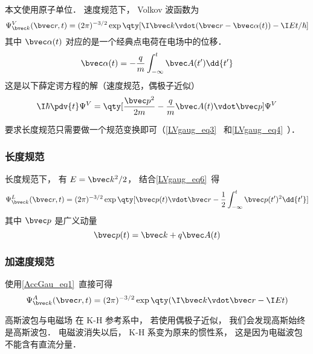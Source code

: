 

本文使用原子单位． 速度规范下， Volkov 波函数为
\begin{equation}
\Psi_{\bvec k}^V(\bvec r, t) = (2\pi)^{-3/2} \exp\qty[\I \bvec k \vdot (\bvec r - \bvec \alpha(t)) - \I Et/\hbar]
\end{equation}
其中 $\bvec \alpha(t)$ 对应的是一个经典点电荷在电场中的位移．
\begin{equation}
\bvec \alpha(t) = -\frac{q}{m} \int_{-\infty}^t \bvec A(t') \dd{t'}
\end{equation}
这是以下薛定谔方程的解（速度规范，偶极子近似）
\begin{equation}
\I\hbar \pdv{t} \Psi^V = \qty[\frac{\bvec p^2}{2m} - \frac{q}{m}\bvec A(t) \vdot \bvec p] \Psi^V
\end{equation}

要求长度规范只需要做一个规范变换即可（\autoref{LVgaug_eq3}~ 和\autoref{LVgaug_eq4}~）．

\subsubsection{长度规范}
长度规范下， 有 $E = \bvec k^2/2$， 结合\autoref{LVgaug_eq6}~得
\begin{equation}
\Psi_{\bvec k}^L(\bvec r, t) = (2\pi)^{-3/2} \exp\qty[\bvec p(t)\vdot \bvec r - \frac{1}{2}\int_{-\infty}^t \bvec p(t')^2 \dd{t'}]
\end{equation}
其中 $\bvec p$ 是广义动量
\begin{equation}
\bvec p(t) = \bvec k + q\bvec A(t)
\end{equation}

\subsubsection{加速度规范}
使用\autoref{AccGau_eq1}~直接可得
\begin{equation}
\Psi_{\bvec k}^A(\bvec r, t) = (2\pi)^{-3/2} \exp\qty(\I\bvec k \vdot \bvec r - \I Et)
\end{equation}

\begin{example}{高斯波包与电磁场}
在 K-H 参考系中， 若使用偶极子近似， 我们会发现高斯始终是高斯波包． 电磁波消失以后， K-H 系变为原来的惯性系， 这是因为电磁波包不能含有直流分量．
\end{example}
